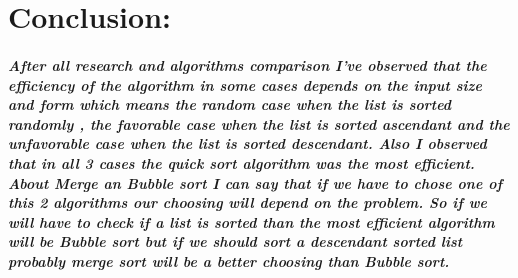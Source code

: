 \documentclass[12pt]{article}
\begin{document}
\section{Conclusion:}
\subparagraph*{After all research and algorithms comparison I've observed that the efficiency of the algorithm in some cases depends on the input size and form which means the random case when the list is sorted randomly , the favorable case when the list is sorted ascendant and the unfavorable case when the list is sorted descendant. Also I observed that in all 3 cases the quick sort algorithm was the most efficient.
About Merge an Bubble sort I can say that if we have to chose one of this 2 algorithms our choosing will depend on the problem. So if we will have to check if a list is sorted than the most efficient algorithm will be Bubble sort but if we should sort a descendant sorted list probably merge sort will be a better choosing than Bubble sort.}
\end{document}
